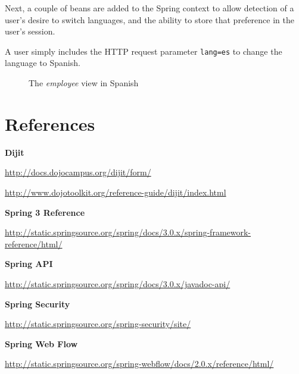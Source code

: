 \documentclass{article}
\begin{document}


Next, a couple of beans are added to the Spring context to allow detection of a user's desire to switch languages, and the ability to store that preference in the user's session.



A user simply includes the HTTP request parameter \texttt{lang=es} to change the language to Spanish.

\vspace{10pt}
\begin{figure}[H]
\begin{center}
\end{center}
\caption{The \emph{employee} view in Spanish}
\label{fig:i18n/view-employees-spanish}
\end{figure}

\pagebreak
\section{References}

\bf{Dijit}

\href{http://docs.dojocampus.org/dijit/form/}{http://docs.dojocampus.org/dijit/form/}

\href{http://www.dojotoolkit.org/reference-guide/dijit/index.html}{http://www.dojotoolkit.org/reference-guide/dijit/index.html}

\bf{Spring 3 Reference}

\href{http://static.springsource.org/spring/docs/3.0.x/spring-framework-reference/html/}{http://static.springsource.org/spring/docs/3.0.x/spring-framework-reference/html/}

\bf{Spring API}

\href{http://static.springsource.org/spring/docs/3.0.x/javadoc-api/}{http://static.springsource.org/spring/docs/3.0.x/javadoc-api/}

\bf{Spring Security}

\href{http://static.springsource.org/spring-security/site/}{http://static.springsource.org/spring-security/site/}

\bf{Spring Web Flow}

\href{http://static.springsource.org/spring-webflow/docs/2.0.x/reference/html/}{http://static.springsource.org/spring-webflow/docs/2.0.x/reference/html/}
\end{document}
